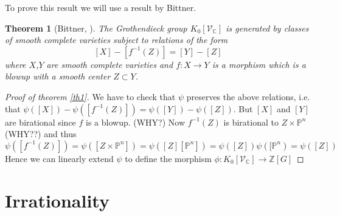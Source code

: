 \documentclass[11pt, a4paper, german]{article}
\theoremstyle{plain}
\newtheorem{theorem}{Theorem}
\theoremstyle{definition}
\newcommand{\gring}[1][k]{K_0[\mathcal{V}_#1]}
\begin{document}
To prove this result we will use a result by Bittner. 

\begin{theorem}[Bittner, {\cite[Theorem 3.1]{Bittner}}] 
    The Grothendieck group $\gring[\mathbb{C}]$ is generated by classes of smooth complete varieties subject to relations of the form
    \[
        [X] - [f^{-1}(Z)] = [Y] - [Z]
    \]
    where $X$,$Y$ are smooth complete varieties and $f: X \to Y$ is a morphism which is a blowup with a smooth center $Z \subset Y$.
\end{theorem}
\begin{proof}[Proof of theorem \ref{th1}]
    We have to check that $\psi$ preserves the above relations, i.e. that $\psi([X]) - \psi([f^{-1}(Z)]) = \psi([Y]) - \psi([Z])$. 
    But $[X]$ and $[Y]$ are birational since $f$ is a blowup. (WHY?)
    Now $f^{-1}(Z)$ is birational to $Z \times \mathbb{P}^n$ (WHY??) and thus 
    \[
        \psi([f^{-1}(Z)]) = \psi([Z \times \mathbb{P}^n]) = \psi([Z][\mathbb{P}^n]) = \psi([Z])\psi([\mathbb{P}^n) = \psi([Z])
    \]
    Hence we can linearly extend $\psi$ to define the morphism $\phi: \gring[\mathbb{C}] \to \mathbb{Z} [G]$
\end{proof}

\section{Irrationality}

{}

\end{document}
